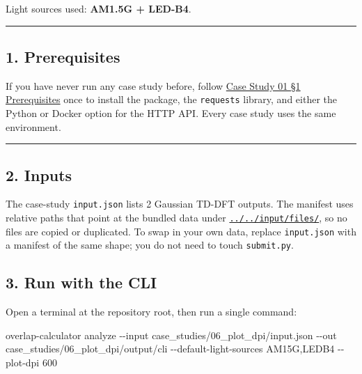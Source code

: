 \documentclass[
  11pt,
]{article}
\newenvironment{Shaded}{}{}
\newcommand{\AttributeTok}[1]{\textcolor[rgb]{0.49,0.56,0.16}{#1}}
\newcommand{\ExtensionTok}[1]{#1}
\newcommand{\NormalTok}[1]{#1}
\begin{document}
Light sources used: \textbf{AM1.5G + LED-B4}.

\begin{center}\rule{0.5\linewidth}{0.5pt}\end{center}

\hypertarget{1-prerequisites}{
\subsection{1. Prerequisites}\label{1-prerequisites}}

If you have never run any case study before, follow
\href{https://github.com/pinarsyt/overlap-calculator/blob/main/case_studies/01_theoretical_only/README.md\#1-prerequisites}{Case
Study 01 §1 Prerequisites} once to install the package, the
\texttt{requests} library, and either the Python or Docker option for
the HTTP API. Every case study uses the same environment.

\begin{center}\rule{0.5\linewidth}{0.5pt}\end{center}

\hypertarget{2-inputs}{
\subsection{2. Inputs}\label{2-inputs}}

The case-study \texttt{input.json} lists 2 Gaussian TD-DFT outputs. The
manifest uses relative paths that point at the bundled data under
\href{https://github.com/pinarsyt/overlap-calculator/blob/main/input/files}{\texttt{../../input/files/}},
so no files are copied or duplicated. To swap in your own data, replace
\texttt{input.json} with a manifest of the same shape; you do not need
to touch \texttt{submit.py}.

\hypertarget{3-run-with-the-cli}{
\subsection{3. Run with the CLI}\label{3-run-with-the-cli}}

Open a terminal at the repository root, then run a single command:

\begin{Shaded}
\begin{Highlighting}[]
\ExtensionTok{overlap{-}calculator}\NormalTok{ analyze }\AttributeTok{{-}{-}input}\NormalTok{ case\_studies/06\_plot\_dpi/input.json }\AttributeTok{{-}{-}out}\NormalTok{ case\_studies/06\_plot\_dpi/output/cli }\AttributeTok{{-}{-}default{-}light{-}sources}\NormalTok{ AM15G,LEDB4 }\AttributeTok{{-}{-}plot{-}dpi}\NormalTok{ 600}
\end{Highlighting}
\end{Shaded}
\end{document}
